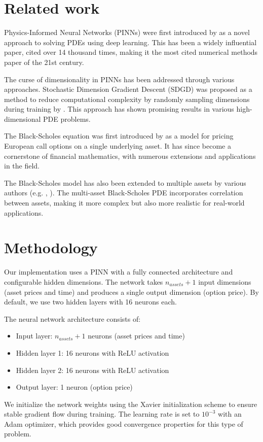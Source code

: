 \documentclass[manuscript,screen,review,acmtog]{acmart}
\begin{document}
\section{Related work}
Physics-Informed Neural Networks (PINNs) were first introduced by \cite{PINNs} as a novel approach to solving PDEs using deep learning. This has been a widely influential paper, cited over 14 thousand times, making it the most cited numerical methods paper of the 21st century.

The curse of dimensionality in PINNs has been addressed through various approaches. Stochastic Dimension Gradient Descent (SDGD) was proposed as a method to reduce computational complexity by randomly sampling dimensions during training by \cite{seminal}. This approach has shown promising results in various high-dimensional PDE problems.

The Black-Scholes equation was first introduced by \cite{bs} as a model for pricing European call options on a single underlying asset. It has since become a cornerstone of financial mathematics, with numerous extensions and applications in the field.

The Black-Scholes model has also been extended to multiple assets by various authors (e.g. \cite{mabs1}, \cite{mabs2}). The multi-asset Black-Scholes PDE incorporates correlation between assets, making it more complex but also more realistic for real-world applications.

\section{Methodology}
Our implementation uses a PINN with a fully connected architecture and configurable hidden dimensions. The network takes $n_{assets} + 1$ input dimensions (asset prices and time) and produces a single output dimension (option price). By default, we use two hidden layers with 16 neurons each.

The neural network architecture consists of:
\begin{itemize}
    \item Input layer: $n_{assets} + 1$ neurons (asset prices and time)
    \item Hidden layer 1: 16 neurons with ReLU activation
    \item Hidden layer 2: 16 neurons with ReLU activation
    \item Output layer: 1 neuron (option price)
\end{itemize}

We initialize the network weights using the Xavier initialization scheme to ensure stable gradient flow during training. The learning rate is set to $10^{-3}$ with an Adam optimizer, which provides good convergence properties for this type of problem.
\end{document}
